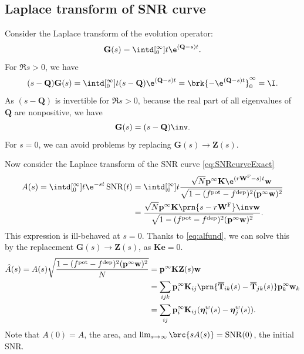 \documentclass[12pt]{article}
\newcommand{\onev}{\mathbf{e}}
\newcommand{\MM}{\mathbf{Q}}
\newcommand{\pr}{\mathbf{p}}
\newcommand{\eq}{\pr^\infty}
\newcommand{\fpt}{\mathbf{T}}
\newcommand{\fptb}{\overline{\fpt}}
\newcommand{\fund}{\mathbf{Z}}
\newcommand{\etw}{\boldsymbol{\eta}^w}
\newcommand{\w}{\mathbf{w}}
\newcommand{\W}{\mathbf{W}}
\newcommand{\enc}{\mathbf{K}}
\newcommand{\frg}{\W^{\mathrm{F}}}
\newcommand{\pot}{^{\text{pot}}}
\newcommand{\dep}{^{\text{dep}}}
\DeclareMathOperator{\SNR}{SNR}
\begin{document}
\subsection{Laplace transform of SNR curve}\label{sec:laplaceSNR}

Consider the Laplace transform of the evolution operator:
%
\begin{equation}\label{eq:levol}
  \mathbf{G}(s) = \intd[_0^{\infty}]{t} \e^{(\MM-s) t}.
\end{equation}
%
For $\Re s>0$, we have
%
\begin{equation}\label{eq:levolcalc}
  (s-\MM)\mathbf{G}(s) = \intd[_0^{\infty}]{t} (s-\MM)\e^{(\MM-s) t} = \brk{-\e^{(\MM-s) t}}_0^{\infty} = \I.
\end{equation}
%
As $(s-\MM)$ is invertible for $\Re s>0$, because the real part of all eigenvalues of $\MM$ are nonpositive, we have
%
\begin{equation}\label{eq:levolres}
  \mathbf{G}(s) = (s-\MM)\inv.
\end{equation}
%
For $s=0$, we can avoid problems by replacing $\mathbf{G}(s) \to \fund(s)$.

Now consider the Laplace transform of the SNR curve \eqref{eq:SNRcurveExact}
%
\begin{equation}\label{eq:lsnr}
\begin{aligned}
  A(s) = \intd[_0^{\infty}]{t} \e^{-st}\SNR(t) 
   &= \intd[_0^{\infty}]{t} \frac{ \sqrt{N} \eq \enc \e^{(r\frg-s)t} \w }
                                { \sqrt{1-(f\pot-f\dep)^2(\eq\w)^2} } \\
   &= \frac{\sqrt{N} \eq \enc \prn{s - r\frg}\inv \w }{\sqrt{1-(f\pot-f\dep)^2(\eq\w)^2}}.
\end{aligned}
\end{equation}
%
This expression is ill-behaved at $s=0$.
Thanks to \eqref{eq:alfund}, we can solve this by the replacement $\mathbf{G}(s) \to \fund(s)$, as $\enc\onev=0$.
%
\begin{equation}\label{eq:larea}
\begin{aligned}
  \hat{A}(s) = A(s) \sqrt{\frac{{{1-(f\pot-f\dep)^2(\eq\w)^2}}}{N}}  &=  \eq \enc \fund(s) \w \\
    &= \sum_{ijk} \eq_i \enc_{ij} \prn{\fptb_{ik}(s)-\fptb_{jk}(s)} \eq_k \w_k \\
    &= \sum_{ij}  \eq_i \enc_{ij} (\etw_{i}(s) - \etw_{j}(s)).
\end{aligned}
\end{equation}
%
Note that $A(0)=A$, the area, and $\lim_{s\to\infty} \brc{sA(s)} = \SNR(0)$, the initial SNR.
\end{document}
